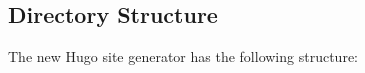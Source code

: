 \documentclass[bsc,frontabs,oneside,singlespacing,parskip,deptreport,logo]{infthesis}
\begin{document}




\subsection{Directory Structure}

The new Hugo site generator has the following structure: %
\end{document}

